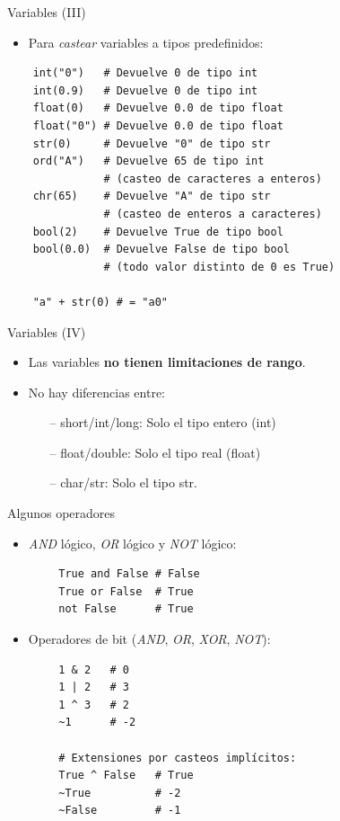 \documentclass[10pt]{beamer} %
\begin{document}
\begin{frame}[fragile]{Variables (III)}
    \begin{itemize}
        \item Para \textit{castear} variables a tipos predefinidos:
    \end{itemize}
    \begin{verbatim}
    int("0")   # Devuelve 0 de tipo int
    int(0.9)   # Devuelve 0 de tipo int
    float(0)   # Devuelve 0.0 de tipo float
    float("0") # Devuelve 0.0 de tipo float
    str(0)     # Devuelve "0" de tipo str
    ord("A")   # Devuelve 65 de tipo int
               # (casteo de caracteres a enteros)
    chr(65)    # Devuelve "A" de tipo str
               # (casteo de enteros a caracteres)
    bool(2)    # Devuelve True de tipo bool
    bool(0.0)  # Devuelve False de tipo bool
               # (todo valor distinto de 0 es True)
    
    "a" + str(0) # = "a0"
    \end{verbatim}
\end{frame}

\begin{frame}{Variables (IV)}
    \begin{itemize}
        \item Las variables \textbf{no tienen limitaciones de rango}.
        \item No hay diferencias entre:
        \begin{itemize}
            \item[--] short/int/long: Solo el tipo entero (int)
            \item[--] float/double: Solo el tipo real (float)
            \item[--] char/str: Solo el tipo str.
        \end{itemize}
    \end{itemize}
\end{frame}

\begin{frame}[fragile]{Algunos operadores}
    \begin{itemize}
        \item \textit{AND} lógico, \textit{OR} lógico y \textit{NOT} lógico:
    \end{itemize}
    \begin{verbatim}
        True and False # False
        True or False  # True
        not False      # True
    \end{verbatim}
    \begin{itemize}
        \item Operadores de bit (\textit{AND}, \textit{OR}, \textit{XOR}, \textit{NOT}):
        
    \end{itemize}
    \begin{verbatim}
        1 & 2   # 0
        1 | 2   # 3
        1 ^ 3   # 2
        ~1      # -2
        
        # Extensiones por casteos implícitos:
        True ^ False   # True
        ~True          # -2
        ~False         # -1
    \end{verbatim}
\end{frame}
\end{document}
